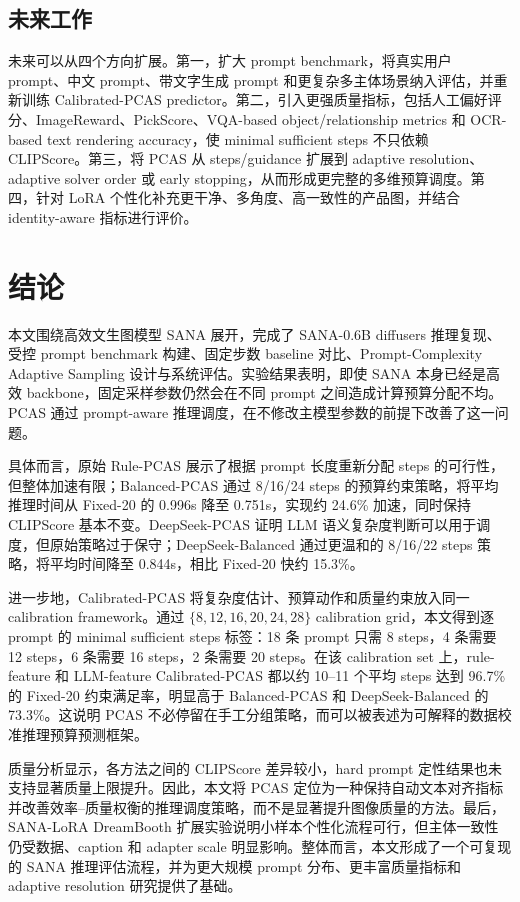 \documentclass[UTF8,zihao=-4,fontset=fandol]{ctexart}
\newcommand{\clipscore}{\textrm{CLIPScore}}
\begin{document}
\subsection{未来工作}

未来可以从四个方向扩展。第一，扩大 prompt benchmark，将真实用户 prompt、中文 prompt、带文字生成 prompt 和更复杂多主体场景纳入评估，并重新训练 Calibrated-PCAS predictor。第二，引入更强质量指标，包括人工偏好评分、ImageReward、PickScore、VQA-based object/relationship metrics 和 OCR-based text rendering accuracy，使 minimal sufficient steps 不只依赖 \clipscore{}。第三，将 PCAS 从 steps/guidance 扩展到 adaptive resolution、adaptive solver order 或 early stopping，从而形成更完整的多维预算调度。第四，针对 LoRA 个性化补充更干净、多角度、高一致性的产品图，并结合 identity-aware 指标进行评价。

\section{结论}

本文围绕高效文生图模型 SANA 展开，完成了 SANA-0.6B diffusers 推理复现、受控 prompt benchmark 构建、固定步数 baseline 对比、Prompt-Complexity Adaptive Sampling 设计与系统评估。实验结果表明，即使 SANA 本身已经是高效 backbone，固定采样参数仍然会在不同 prompt 之间造成计算预算分配不均。PCAS 通过 prompt-aware 推理调度，在不修改主模型参数的前提下改善了这一问题。

具体而言，原始 Rule-PCAS 展示了根据 prompt 长度重新分配 steps 的可行性，但整体加速有限；Balanced-PCAS 通过 8/16/24 steps 的预算约束策略，将平均推理时间从 Fixed-20 的 0.996s 降至 0.751s，实现约 24.6\% 加速，同时保持 \clipscore{} 基本不变。DeepSeek-PCAS 证明 LLM 语义复杂度判断可以用于调度，但原始策略过于保守；DeepSeek-Balanced 通过更温和的 8/16/22 steps 策略，将平均时间降至 0.844s，相比 Fixed-20 快约 15.3\%。

进一步地，Calibrated-PCAS 将复杂度估计、预算动作和质量约束放入同一 calibration framework。通过 $\{8,12,16,20,24,28\}$ calibration grid，本文得到逐 prompt 的 minimal sufficient steps 标签：18 条 prompt 只需 8 steps，4 条需要 12 steps，6 条需要 16 steps，2 条需要 20 steps。在该 calibration set 上，rule-feature 和 LLM-feature Calibrated-PCAS 都以约 10--11 个平均 steps 达到 96.7\% 的 Fixed-20 约束满足率，明显高于 Balanced-PCAS 和 DeepSeek-Balanced 的 73.3\%。这说明 PCAS 不必停留在手工分组策略，而可以被表述为可解释的数据校准推理预算预测框架。

质量分析显示，各方法之间的 \clipscore{} 差异较小，hard prompt 定性结果也未支持显著质量上限提升。因此，本文将 PCAS 定位为一种保持自动文本对齐指标并改善效率--质量权衡的推理调度策略，而不是显著提升图像质量的方法。最后，SANA-LoRA DreamBooth 扩展实验说明小样本个性化流程可行，但主体一致性仍受数据、caption 和 adapter scale 明显影响。整体而言，本文形成了一个可复现的 SANA 推理评估流程，并为更大规模 prompt 分布、更丰富质量指标和 adaptive resolution 研究提供了基础。
\end{document}
